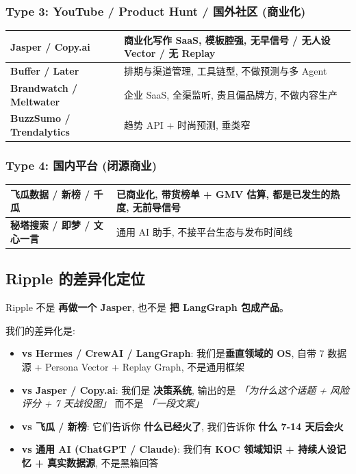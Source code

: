 \subsubsection{Type 3: YouTube / Product Hunt / 国外社区 (商业化)}

\begin{tabularx}{\textwidth}{>{\bfseries}l X}
    \toprule
    Jasper / Copy.ai & 商业化写作 SaaS, 模板腔强, \textbf{无早信号 / 无人设 Vector / 无 Replay} \\
    \midrule
    Buffer / Later & 排期与渠道管理, 工具链型, 不做预测与多 Agent \\
    \midrule
    Brandwatch / Meltwater & 企业 SaaS, 全渠监听, 贵且偏品牌方, 不做内容生产 \\
    \midrule
    BuzzSumo / Trendalytics & 趋势 API + 时尚预测, 垂类窄 \\
    \bottomrule
\end{tabularx}

\subsubsection{Type 4: 国内平台 (闭源商业)}

\begin{tabularx}{\textwidth}{>{\bfseries}l X}
    \toprule
    飞瓜数据 / 新榜 / 千瓜 & 已商业化, 带货榜单 + GMV 估算, \textbf{都是已发生的热度}, 无前导信号 \\
    \midrule
    秘塔搜索 / 即梦 / 文心一言 & 通用 AI 助手, 不接平台生态与发布时间线 \\
    \bottomrule
\end{tabularx}

\subsection{Ripple 的差异化定位}

\begin{insight}
Ripple 不是 \textbf{再做一个 Jasper}, 也不是 \textbf{把 LangGraph 包成产品}。

我们的差异化是:
\begin{itemize}
    \item \textbf{vs Hermes / CrewAI / LangGraph}: 我们是\textbf{垂直领域的 OS}, 自带 7 数据源 + Persona Vector + Replay Graph, 不是通用框架
    \item \textbf{vs Jasper / Copy.ai}: 我们是 \textbf{决策系统}, 输出的是 \textit{「为什么这个话题 + 风险评分 + 7 天战役图」} 而不是 \textit{「一段文案」}
    \item \textbf{vs 飞瓜 / 新榜}: 它们告诉你 \textbf{什么已经火了}, 我们告诉你 \textbf{什么 7-14 天后会火}
    \item \textbf{vs 通用 AI (ChatGPT / Claude)}: 我们有 \textbf{KOC 领域知识 + 持续人设记忆 + 真实数据源}, 不是黑箱回答
\end{itemize}
\end{insight}

